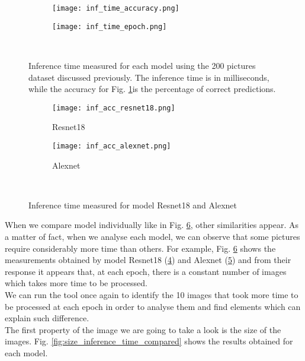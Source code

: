 \begin{figure}[h]
     \begin{subfigure}{0.5\textwidth}
	    \texttt{[image: inf\_time\_accuracy.png]}
	    \caption{}
         \label{fig:inf_time_accuracy}
     \end{subfigure}
     \hfill
     \begin{subfigure}{0.5\textwidth}
	    \texttt{[image: inf\_time\_epoch.png]}
	    \caption{}
        \label{fig:inf_time_epoch}
     \end{subfigure}\\
     \caption[Inference time measured for each model]{Inference time measured for each model using the 200 pictures dataset discussed previously. The inference time is in milliseconds, while the accuracy for Fig. \ref{fig:inf_time_accuracy}is the percentage of correct predictions.}
        \label{fig:inf_time_epoch_c}
\end{figure}

\begin{figure}[h]
     \begin{subfigure}{0.5\textwidth}
	    \texttt{[image: inf\_acc\_resnet18.png]}
	    \caption{Resnet18}
         \label{fig:inf_acc_resnet18}
         
     \end{subfigure}
     \hfill
     \begin{subfigure}{0.5\textwidth}
	    \texttt{[image: inf\_acc\_alexnet.png]}
	    \caption{Alexnet}
        \label{fig:inf_acc_alexnet}
        
     \end{subfigure}\\
     \caption{Inference time measured for model Resnet18 and Alexnet}
        \label{fig:inf_acc_c}
\end{figure}
When we compare model individually like in Fig. \ref{fig:inf_acc_c}, other similarities appear. As a matter of fact, when we analyse each model, we can observe that some pictures require considerably more time than others. For example, Fig. \ref{fig:inf_acc_c} shows the measurements obtained by model Resnet18 (\ref{fig:inf_acc_resnet18}) and Alexnet (\ref{fig:inf_acc_alexnet}) and from their response it appears that, at each epoch, there is a constant number of images which takes more time to be processed. \\
We can run the tool once again to identify the 10 images that took more time to be processed at each epoch in order to analyse them and find elements which can explain such difference. \\
The first property of the image we are going to take a look is the size of the images. Fig. \ref{fig:size_inference_time_compared} shows the results obtained for each model. 


